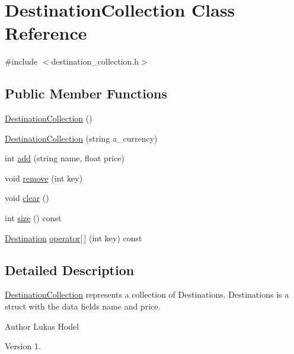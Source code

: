 \hypertarget{classDestinationCollection}{\section{Destination\-Collection Class Reference}
\label{classDestinationCollection}
}


{\ttfamily \#include $<$destination\-\_\-collection.\-h$>$}

\subsection*{Public Member Functions}
\begin{DoxyCompactItemize}
\item 
\hyperlink{classDestinationCollection_a8cd302a3be128dde1c742a40268d0768}{Destination\-Collection} ()
\item 
\hyperlink{classDestinationCollection_ab31794d8d9769b43d4c903f4e835b8be}{Destination\-Collection} (string a\-\_\-currency)
\item 
int \hyperlink{classDestinationCollection_abe6e5181031cc5db9bac4b6a39000964}{add} (string name, float price)
\item 
void \hyperlink{classDestinationCollection_a764aaa3f333fc5d0bc6101e35e2bfbaa}{remove} (int key)
\item 
void \hyperlink{classDestinationCollection_a27de949dd04a84f108f246a579b22fdc}{clear} ()
\item 
int \hyperlink{classDestinationCollection_a35325e80b3ba8d6e935c7474463c9434}{size} () const 
\item 
\hyperlink{structDestination}{Destination} \hyperlink{classDestinationCollection_af0552ec87e81f036994e8d9838bc36ea}{operator\mbox{[}$\,$\mbox{]}} (int key) const 
\end{DoxyCompactItemize}


\subsection{Detailed Description}
\hyperlink{classDestinationCollection}{Destination\-Collection} represents a collection of Destinations. Destinations is a struct with the data fields name and price.

\begin{DoxyAuthor}{Author}
Lukas Hodel 
\end{DoxyAuthor}
\begin{DoxyVersion}{Version}
1. 
\end{DoxyVersion}


